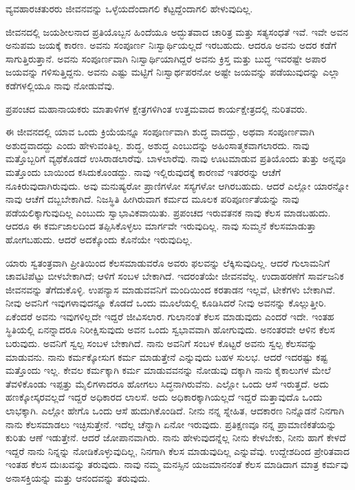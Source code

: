ವ್ಯವಹಾರಚತುರರು ಜೀವನವನ್ನು ಒಳ್ಳೆಯದೆಂದಾಗಲಿ ಕೆಟ್ಟದ್ದೆಂದಾಗಲಿ ಹೇಳುವುದಿಲ್ಲ.

ಜೀವನದಲ್ಲಿ ಜಯಶೀಲನಾದ ಪ್ರತಿಯೊಬ್ಬನ ಹಿಂದೆಯೂ ಅದ್ಭುತವಾದ ಚಾರಿತ್ರ ಮತ್ತು ಸತ್ಯಸಂಧತೆ ಇವೆ. ಇವೇ ಅವನ ಅನುಪಮ ಜಯಕ್ಕೆ ಕಾರಣ. ಅವನು ಸಂಪೂರ್ಣ ನಿಃಸ್ವಾರ್ಥಿಯಲ್ಲದೆ ಇರಬಹುದು. ಆದರೂ ಅವನು ಅದರ ಕಡೆಗೆ ಸಾಗುತ್ತಿರುತ್ತಾನೆ. ಅವನು ಸಂಪೂರ್ಣವಾಗಿ ನಿಃಸ್ವಾರ್ಥಿಯಾಗಿದ್ದರೆ ಅವನು ಕ್ರಿಸ್ತ ಮತ್ತು ಬುದ್ಧ ಇವರಷ್ಟೇ ಅಪಾರ ಜಯವನ್ನು ಗಳಿಸುತ್ತಿದ್ದನು. ಅವನು ಎಷ್ಟು ಮಟ್ಟಿಗೆ ನಿಃಸ್ವಾರ್ಥಪರನೋ ಅಷ್ಟೇ ಜಯವನ್ನು ಪಡೆಯುವುದನ್ನು ಎಲ್ಲಾ ಕಡೆಗಳಲ್ಲಿಯೂ ನಾವು ನೋಡುವೆವು.

ಪ್ರಪಂಚದ ಮಹಾನಾಯಕರು ಮಾತಾಳಿಗಳ ಕ್ಷೇತ್ರಗಳಿಗಿಂತ ಉತ್ತಮವಾದ ಕಾರ್ಯಕ್ಷೇತ್ರದಲ್ಲಿ ನುರಿತವರು.

ಈ ಜೀವನದಲ್ಲಿ ಯಾವ ಒಂದು ಕ್ರಿಯೆಯನ್ನೂ ಸಂಪೂರ್ಣವಾಗಿ ಶುದ್ಧ ವಾದದ್ದು, ಅಥವಾ ಸಂಪೂರ್ಣವಾಗಿ ಅಶುದ್ಧವಾದದ್ದು ಎಂದು ಹೇಳುವಂತಿಲ್ಲ. ಶುದ್ಧ, ಅಶುದ್ಧ ಎಂಬುದನ್ನು ಅಹಿಂಸಾತ್ಮಕವಾಗಲಾರದು. ನಾವು ಮತ್ತೊಬ್ಬರಿಗೆ ವ್ಯಥೆಕೊಡದೆ ಉಸಿರಾಡಲಾರೆವು. ಬಾಳಲಾರೆವು. ನಾವು ಊಟಮಾಡುವ ಪ್ರತಿಯೊಂದು ತುತ್ತು ಅನ್ನವೂ ಮತ್ತೊಂದು ಬಾಯಿಂದ ಕಸಿದುಕೊಂಡದ್ದು. ನಾವು ಇಲ್ಲಿರುವುದಕ್ಕೆ ಕಾರಣವೆ ಇತರರನ್ನು ಆಚೆಗೆ ನೂಕಿರುವುದಾಗಿರುವುದು. ಅವು ಮನುಷ್ಯರೋ ಪ್ರಾಣಿಗಳೋ ಸಸ್ಯಗಳೋ ಆಗಿರಬಹುದು. ಆದರೆ ಎಲ್ಲೋ ಯಾರನ್ನೋ ನಾವು ಆಚೆಗೆ ದಬ್ಬಬೇಕಾಗಿದೆ. ನಿಜಸ್ಥಿತಿ ಹೀಗಿರುವಾಗ ಕರ್ಮದ ಮೂಲಕ ಪರಿಪೂರ್ಣತೆಯನ್ನು ನಾವು ಪಡೆಯಲಿಕ್ಕಾಗುವುದಿಲ್ಲ ಎಂಬುದು ಸ್ವಾಭಾವಿಕವಾಯಿತು. ಪ್ರಪಂಚದ ಇರುವತನಕ ನಾವು ಕೆಲಸ ಮಾಡಬಹುದು. ಆದರೂ ಈ ಕರ್ಮಜಾಲದಿಂದ ತಪ್ಪಿಸಿಕೊಳ್ಳಲು ಮಾರ್ಗವೇ ಇರುವುದಿಲ್ಲ. ನಾವು ಸುಮ್ಮನೆ ಕೆಲಸಮಾಡುತ್ತಾ ಹೋಗಬಹುದು. ಆದರೆ ಅದಕ್ಕೊಂದು ಕೊನೆಯೇ ಇರುವುದಿಲ್ಲ.

ಯಾರು ಸ್ವತಂತ್ರವಾಗಿ ಪ್ರೀತಿಯಿಂದ ಕೆಲಸಮಾಡುವರೊ ಅವರು ಫಲವನ್ನು ಲೆಕ್ಕಿಸುವುದಿಲ್ಲ. ಆದರೆ ಗುಲಾಮನಿಗೆ ಚಾವಟಿಪೆಟ್ಟು ಬೀಳಬೇಕಾಗಿದೆ; ಆಳಿಗೆ ಸಂಬಳ ಬೇಕಾಗಿದೆ. ಇದರಂತೆಯೇ ಜೀವನವೆಲ್ಲ. ಉದಾಹರಣೆಗೆ ಸಾರ್ವಜನಿಕ ಜೀವನವನ್ನು ತೆಗೆದುಕೊಳ್ಳಿ. ಉಪನ್ಯಾಸ ಮಾಡುವವನಿಗೆ ಮಂದಿಯಿಂದ ಕರತಾಡನ ಇಲ್ಲವೆ, ಟೀಕೆಗಳು ಬೇಕಾಗಿವೆ. ನೀವು ಅವನಿಗೆ ಇವುಗಳಾವುದನ್ನೂ ಕೊಡದೆ ಒಂದು ಮೂಲೆಯಲ್ಲಿ ಕೂಡಿಸಿದರೆ ನೀವು ಅವನನ್ನು ಕೊಲ್ಲುತ್ತೀರಿ. ಏಕೆಂದರೆ ಅವನು ಇವುಗಳಿಲ್ಲದೇ ಇದ್ದರೆ ಜೀವಿಸಲಾರ. ಗುಲಾನಂತೆ ಕೆಲಸ ಮಾಡುವುದು ಎಂದರೆ ಇದೇ. ಇಂತಹ ಸ್ಥಿತಿಯಲ್ಲಿ ಏನನ್ನಾದರೂ ನಿರೀಕ್ಷಿಸುವುದು ಅವನ ಒಂದು ಸ್ವಭಾವವಾಗಿ ಹೋಗುವುದು. ಅನಂತರವೇ ಆಳಿನ ಕೆಲಸ ಬರುವುದು. ಅವನಿಗೆ ಸ್ವಲ್ಪ ಸಂಬಳ ಬೇಕಾಗಿದೆ. ನಾನು ಅವನಿಗೆ ಸಂಬಳ ಕೊಟ್ಟರೆ ಅವನು ಸ್ವಲ್ಪ ಕೆಲಸವನ್ನು ಮಾಡುವನು. ನಾನು ಕರ್ಮಕ್ಕೋಸುಗ ಕರ್ಮ ಮಾಡುತ್ತೇನೆ ಎನ್ನುವುದು ಬಹಳ ಸುಲಭ. ಆದರೆ ಇದರಷ್ಟು ಕಷ್ಟ ಮತ್ತೊಂದು ಇಲ್ಲ. ಕೇವಲ ಕರ್ಮಕ್ಕಾಗಿ ಕರ್ಮ ಮಾಡುವವನನ್ನು ನೋಡುವು ದಕ್ಕಾಗಿ ನಾನು ಕೈಕಾಲುಗಳ ಮೇಲೆ ತೆವಳಿಕೊಂಡು ಇಪ್ಪತ್ತು ಮೈಲಿಗಳಾದರೂ ಹೋಗಲು ಸಿದ್ಧನಾಗಿರುವೆನು. ಎಲ್ಲೋ ಒಂದು ಆಸೆ ಇರುತ್ತದೆ. ಅದು ಹಣಕ್ಕೋಸ್ಕರವಲ್ಲದೆ ಇದ್ದರೆ ಅಧಿಕಾರದ ಲಾಲಸೆ. ಅದು ಅಧಿಕಾರಕ್ಕಾಗಿಯಲ್ಲದೆ ಇದ್ದರೆ ಮತ್ತಾವುದೊ ಒಂದು ಲಾಭಕ್ಕಾಗಿ. ಎಲ್ಲೋ ಹೇಗೊ ಒಂದು ಆಸೆ ಹುದುಗಿಕೊಂಡಿದೆ. ನೀನು ನನ್ನ ಸ್ನೇಹಿತ, ಆದಕಾರಣ ನಿನ್ನೊಡನೆ ನಿನಗಾಗಿ ನಾನು ಕೆಲಸಮಾಡಲು ಇಚ್ಛಿಸುತ್ತೇನೆ. ಇದೆಲ್ಲ ಚೆನ್ನಾಗಿ ಏನೋ ಇರುವುದು. ಪ್ರತಿಕ್ಷಣವೂ ನನ್ನ ಪ್ರಾಮಾಣಿಕತೆಯನ್ನು ಕುರಿತು ಆಣೆ ಇಡುತ್ತೇನೆ. ಆದರೆ ಜೋಪಾನವಾಗಿರು. ನಾನು ಹೇಳುವುದನ್ನೆಲ್ಲ ನೀನು ಕೇಳಬೇಕು, ನೀನು ಹಾಗೆ ಕೇಳದೆ ಇದ್ದರೆ ನಾನು ನಿನ್ನನ್ನು ನೋಡಿಕೊಳ್ಳುವುದಿಲ್ಲ, ನಿನಗಾಗಿ ಕೆಲಸ ಮಾಡುವುದಿಲ್ಲ ಎನ್ನುವೆವು. ಉದ್ದೇಶದಿಂದ ಪ್ರೇರಿತವಾದ ಇಂತಹ ಕೆಲಸ ದುಃಖವನ್ನು ತರುವುದು. ನಾವು ನಮ್ಮ ಮನಸ್ಸಿನ ಯಜಮಾನನಂತೆ ಕೆಲಸ ಮಾಡಿದಾಗ ಮಾತ್ರ ಕರ್ಮವು ಅನಾಸಕ್ತಿಯನ್ನು ಮತ್ತು ಆನಂದವನ್ನು ತರುವುದು.

